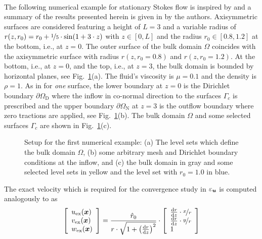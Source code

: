 \documentclass[12pt, twoside, english]{article}
\numberwithin{equation}{section}
\newcommand{\vek}[1]{\mathchoice{\displaystyle\boldsymbol#1}
{\textstyle\boldsymbol#1}{\scriptstyle\boldsymbol#1}
{\scriptscriptstyle\boldsymbol#1}}
\begin{document}
\\
The following numerical example for stationary Stokes flow is inspired by \cite{Fries_2018a} and a summary of the results presented herein is given in \cite{Fries_2024a} by the authors. Axisymmetric surfaces are considered featuring a height of $L = 3$ and a variable radius of $r(z,r_0) = r_0 + \nicefrac{1}{5} \cdot \sin(1+3\cdot z)$ with $z \in \left[0,L\right]$ and the radius $r_0 \in \left[0.8,1.2\right]$ at the bottom, i.e., at $z=0$. The outer surface of the bulk domain $\Omega$ coincides with the axisymmetric surface with radius $r(z,r_0 = 0.8)$ and $r(z,r_0 = 1.2)$. At the bottom, i.e., at $z=0$, and the top, i.e., at $z=3$, the bulk domain is bounded by horizontal planes, see Fig.~\ref{fig:TC1-setup}(a). The fluid's viscosity is $\mu = 0.1$ and the density is $\rho = 1$. As in \cite{Fries_2018a} for \emph{one} surface, the lower boundary at $z=0$ is the Dirichlet boundary $\partial\Omega_{\mathrm{D}}$ where the inflow in co-normal direction to the surfaces $\Gamma_{\!c}$ is prescribed and the upper boundary $\partial\Omega_{\mathrm{N}}$ at $z=3$ is the outflow boundary where zero tractions are applied, see Fig.~\ref{fig:TC1-setup}(b). The bulk domain $\Omega$ and some selected surfaces $\Gamma_{\!c}$ are shown in Fig.~\ref{fig:TC1-setup}(c).
\begin{figure}
	\centering
	
	\hspace{1.5cm}
	\hspace{2cm}
	
	\caption{\label{fig:TC1-setup} Setup for the first numerical example: (a) The level sets which define the bulk domain $\Omega$, (b) some arbitrary mesh and Dirichlet boundary conditions at the inflow, and (c) the bulk domain in gray and some selected level sets in yellow and the level set with $r_0=1.0$ in blue.}
\end{figure}
The exact velocity which is required for the convergence study in $\varepsilon_{\vek{u}}$ is computed analogously to \cite{Fries_2024a} as
\[
\left[\begin{array}{l}
	u_{\mathrm{ex}}(\vek{x})\\
	v_{\mathrm{ex}}(\vek{x})\\
	w_{\mathrm{ex}}(\vek{x})
\end{array}\right]=\frac{\hat{r}_{0}}{r\cdot\sqrt{1+\left(\frac{\mathrm{d}r}{\mathrm{d}z}\right)^{2}}}\cdot\left[\begin{array}{l}
	\frac{\mathrm{d}r}{\mathrm{d}z}\cdot\nicefrac{x}{r}\\
	\frac{\mathrm{d}r}{\mathrm{d}z}\cdot\nicefrac{y}{r}\\
	1
\end{array}\right]
\]
\end{document}
